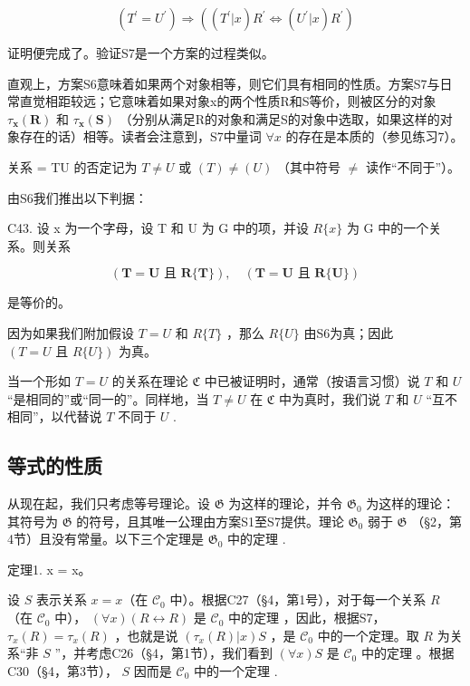 \[
(T ^ {\prime} = U ^ {\prime}) \Longrightarrow ((T ^ {\prime} | x) R ^ {\prime} \Longleftrightarrow (U ^ {\prime} | x) R ^ {\prime})
\]

证明便完成了。验证S7是一个方案的过程类似。

直观上，方案S6意味着如果两个对象相等，则它们具有相同的性质。方案S7与日常直觉相距较远；它意味着如果对象x的两个性质R和S等价，则被区分的对象 \(\tau_{\mathbf{x}}(\mathbf{R})\) 和 \(\tau_{\mathbf{x}}(\mathbf{S})\) （分别从满足R的对象和满足S的对象中选取，如果这样的对象存在的话）相等。读者会注意到，S7中量词 \(\forall x\) 的存在是本质的（参见练习7）。

关系 = TU 的否定记为 \(T \neq U\) 或 \((T) \neq (U)\) （其中符号 \(\neq\) 读作“不同于”）。

由S6我们推出以下判据：

C43. 设 x 为一个字母，设 T 和 U 为 G 中的项，并设 \(R\{x\}\) 为 G 中的一个关系。则关系

\[
(\boldsymbol {T} = \boldsymbol {U} \text {   且   } \boldsymbol {R} \{\boldsymbol {T} \}), \quad (\boldsymbol {T} = \boldsymbol {U} \text {   且   } \boldsymbol {R} \{\boldsymbol {U} \})
\]

是等价的。

因为如果我们附加假设 \(T = U\) 和 \(R\{T\}\) ，那么 \(R\{U\}\) 由S6为真；因此 \((T = U \text{ 且 } R\{U\})\) 为真。

当一个形如 \(T = U\) 的关系在理论 \(\mathfrak{C}\) 中已被证明时，通常（按语言习惯）说 \(T\) 和 \(U\) “是相同的”或“同一的”。同样地，当 \(T \neq U\) 在 \(\mathfrak{C}\) 中为真时，我们说 \(T\) 和 \(U\) “互不相同”，以代替说 \(T\) 不同于 \(U\) .

\subsection{等式的性质}

从现在起，我们只考虑等号理论。设 \(\mathfrak{G}\) 为这样的理论，并令 \(\mathfrak{G}_0\) 为这样的理论：其符号为 \(\mathfrak{G}\) 的符号，且其唯一公理由方案S1至S7提供。理论 \(\mathfrak{G}_0\) 弱于 \(\mathfrak{G}\) （§2，第4节）且没有常量。以下三个定理是 \(\mathfrak{G}_0\) 中的定理 .

定理1. x = x。

设 \(S\) 表示关系 \(x = x\)（在 \(\mathcal{C}_0\) 中）。根据C27（§4，第1号），对于每一个关系 \(R\)（在 \(\mathcal{C}_0\) 中）， \((\forall x)(R \leftrightarrow R)\) 是 \(\mathcal{C}_0\) 中的定理 ，因此，根据S7， \(\tau_x(R) = \tau_x(R)\) ，也就是说 \((\tau_x(R)|x)S\) ，是 \(\mathcal{C}_0\) 中的一个定理。取 \(R\) 为关系“非 \(S\) ''，并考虑C26（§4，第1节），我们看到 \((\forall x)S\) 是 \(\mathcal{C}_0\) 中的定理 。根据C30（§4，第3节）， \(S\) 因而是 \(\mathcal{C}_0\) 中的一个定理 .

